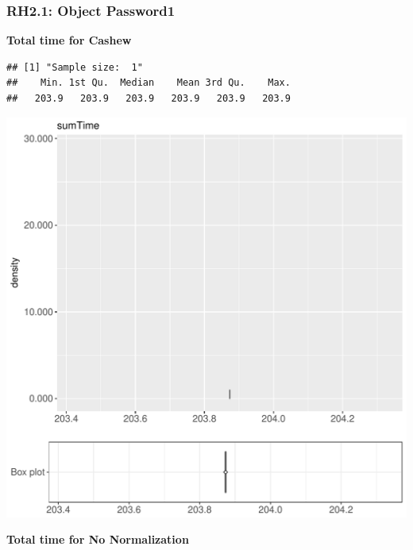 \documentclass{article}\usepackage[]{graphicx}\usepackage[]{color}
\makeatletter
\def\maxwidth{ %
  \ifdim\Gin@nat@width>\linewidth
    \linewidth
  \else
    \Gin@nat@width
  \fi
}
\newenvironment{kframe}{%
 \def\at@end@of@kframe{}%
 \ifinner\ifhmode%
  \def\at@end@of@kframe{\end{minipage}}%
  \begin{minipage}{\columnwidth}%
 \fi\fi%
 \def\FrameCommand##1{\hskip\@totalleftmargin \hskip-\fboxsep
 \colorbox{shadecolor}{##1}\hskip-\fboxsep
     \hskip-\linewidth \hskip-\@totalleftmargin \hskip\columnwidth}%
 \MakeFramed {\advance\hsize-\width
   \@totalleftmargin\z@ \linewidth\hsize
   \@setminipage}}%
 {\par\unskip\endMakeFramed%
 \at@end@of@kframe}
\newenvironment{knitrout}{}{} %
\makeatother
\begin{document}
\subsubsection{RH2.1: Object Password1}

 \textbf{Total time for Cashew}
\begin{knitrout}
\color{fgcolor}\begin{kframe}
\begin{verbatim}
## [1] "Sample size:  1"
##    Min. 1st Qu.  Median    Mean 3rd Qu.    Max. 
##   203.9   203.9   203.9   203.9   203.9   203.9
\end{verbatim}


{\ttfamily\noindent\bfseries{}}\end{kframe}
\includegraphics[width=\maxwidth]{figure/RH2_cashew_password-1} 

\end{knitrout}
 \textbf{Total time for No Normalization}
\end{document}
